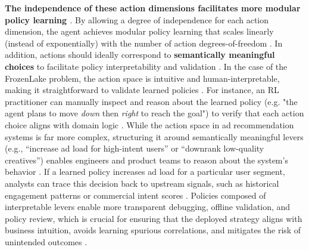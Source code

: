 \documentclass[final]{anthology-ch}         %
\begin{document}
\textbf{The independence of these action dimensions facilitates more modular policy learning \cite{tavakoli2018action, sharma2017learning}}. By allowing a degree of independence for each action dimension, the agent achieves modular policy learning that scales linearly (instead of exponentially) with the number of action degrees-of-freedom \cite{tavakoli2018action}. In addition, actions should ideally correspond to \textbf{semantically meaningful choices} to facilitate policy interpretability and validation \cite{glanois2024survey, puiutta2020explainable}. In the case of the FrozenLake problem, the action space is intuitive and human-interpretable, making it straightforward to validate learned policies \cite{brockman2016openai, Sutton1998}. For instance, an RL practitioner can manually inspect and reason about the learned policy (e.g. "the agent plans to move \textit{down} then \textit{right} to reach the goal") to verify that each action choice aligns with domain logic \cite{brockman2016openai}. While the action space in ad recommendation systems is far more complex, structuring it around semantically meaningful levers (e.g., “increase ad load for high-intent users” or “downrank low-quality creatives”) enables engineers and product teams to reason about the system’s behavior \cite{glanois2024survey, dulac2021challenges}. If a learned policy increases ad load for a particular user segment, analysts can trace this decision back to upstream signals, such as historical engagement patterns or commercial intent scores \cite{gauci2018horizon, dulac2021challenges}. Policies composed of interpretable levers enable more transparent debugging, offline validation, and policy review, which is crucial for ensuring that the deployed strategy aligns with business intuition, avoids learning spurious correlations, and mitigates the risk of unintended outcomes \cite{dulac2021challenges, verma2018programmatically, puiutta2020explainable, glanois2024survey}.
\end{document}
